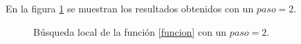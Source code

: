 \documentclass{article}
\begin{document}
En la figura \ref{f3} se muestran los resultados obtenidos con un $paso = 2$.

\begin{figure}[h!]
\centering
{}
\caption{Búsqueda local de la función \eqref{funcion} con un $paso = 2$.} 
\label{f3}
\end{figure}
\end{document}
